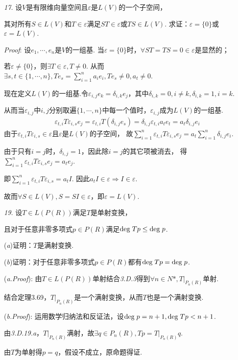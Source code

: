 \newpage

\textit{17.}
设\(V\)是有限维向量空间且\(\varepsilon\)是\(L(V)\)的一个子空间，

其对所有\(S \in L(V)\)和\(T \in \varepsilon\)满足\(ST \in \varepsilon\)或\(TS \in L(V)\).
求证：\(\varepsilon=\{0\}\)或\(\varepsilon=L(V)\).

\textit{Proof}:
设\(e_1,\cdots,e_n\)是\(V\)的一组基.
当\(\varepsilon =\{0\}\)时，\(\forall ST=TS=0 \in \varepsilon\)是显然的；

若\(\varepsilon \ne \{0\}\)，则\(\exists T \in \varepsilon, T \ne 0\).
从而\(\exists s,t \in \{1,\cdots,n\},Te_s=\sum_{i=1}^n a_ie_i ,Te_s \ne 0, a_t \ne 0\).

现在定义\(L(V)\)的一组基.令\(\varepsilon_{i,j}e_k=\delta_{i,k}e_j\)，其中\(\delta_{i,k}=0,i \ne k,\delta_{i,k}=1,i=k\).

从而当\(\varepsilon_{i,j}\)中\(i,j\)分别取遍\(\{1,\cdots,n\}\)中每一个值时，\(\varepsilon_{i,j}\)成为\(L(V)\)的一组基.
    \begin{align*}
        \varepsilon_{t,i}T\varepsilon_{i,s}e_j=\varepsilon_{t,i}T(\delta_{i,j} e_s) 
        =\delta_{i,j}\varepsilon_{t,i}a_te_t=a_t\delta_{i,j}e_i
    \end{align*}
由于\(\varepsilon_{t,i}T\varepsilon_{i,s} \in \varepsilon\)且\(\varepsilon\)是\(L(V)\)的子空间，
故\(\sum_{i=1}^n \varepsilon_{t,i}T\varepsilon_{i,s}e_j=a_t \sum_{i=1}^n \delta_{i,j}e_i\).

由于只有\(i=j\)时，\(\delta_{i,j}=1\)，因此除\(i=j\)的其它项被消去，
得\(\sum_{i=1}^n \varepsilon_{t,i} T \varepsilon_{i,s} e_j=a_te_j\).

即\(\sum_{i=1}^n \varepsilon_{t,i} T \varepsilon_{i,s} =a_t I\).
因此\(a_t I \in \varepsilon \Rightarrow I \in \varepsilon\).

故而\(\forall S \in L(V),S=SI \in \varepsilon\)，即\(\varepsilon=L(V)\).

\hspace*{\fill}

\textit{19.}
设\(T \in L(P(R))\)满足\(T\)是单射变换，

且对于任意非零多项式\(p \in P(R)\)满足\(\mathrm{deg \;} Tp \leq \mathrm{deg \;} p\).

(\textit{a})证明：\(T\)是满射变换.

(\textit{b})证明：对于任意非零多项式\(p \in P(R)\)都有\(\mathrm{deg \;} Tp=\mathrm{deg \;} p\).

(\textit{a.Proof}):
由\(T \in L(P(R))\)单射结合\textit{3.D.3}得到\(\forall n \in N*,T|_{P_n(R)}\)单射.

结合定理3.69，\(T|_{P_n(R)}\)是一个满射变换，从而\(T\)也是一个满射变换.

(\textit{b.Proof}):
运用数学归纳法和反证法，设\(\mathrm{deg \;} p=n+1,\mathrm{deg \;} Tp<n+1\).

由\textit{3.D.19.a}，\(T|_{P_n(R)}\)满射，故\(\exists q \in P_n(R),Tp=T|_{P_n(R)}q\).

由\(T\)为单射得\(p=q\)，假设不成立，原命题得证.

